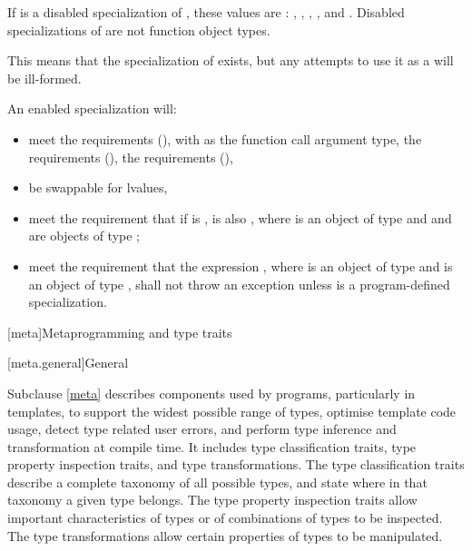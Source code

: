 \pnum
If  is a disabled specialization of ,
these values are :
,
,
,
, and
.
Disabled specializations of 
are not function object types.
\begin{note}
This means that the specialization of  exists, but
any attempts to use it as a  will be ill-formed.
\end{note}

\pnum
An enabled specialization  will:
\begin{itemize}
\item meet the  requirements (),
with  as the function
call argument type, the  requirements (),
the  requirements (),
\item be swappable for lvalues,
\item meet the requirement that if  is ,  is
also , where  is an object of type  and  and 
are objects of type ;
\item meet the requirement that the expression , where 
is an object of type  and  is an object of type
, shall not throw an exception unless  is a
program-defined specialization.
\end{itemize}

[meta]{Metaprogramming and type traits}

[meta.general]{General}

\pnum
Subclause \ref{meta} describes components used by \Cpp{} programs, particularly in
templates, to support the widest possible range of types, optimise
template code usage, detect type related user errors, and perform
type inference and transformation at compile time. It includes type
classification traits, type property inspection traits, and type
transformations. The type classification traits describe a complete taxonomy
of all possible \Cpp{} types, and state where in that taxonomy a given
type belongs. The type property inspection traits allow important
characteristics of types or of combinations of types to be inspected. The
type transformations allow certain properties of types to be manipulated.

